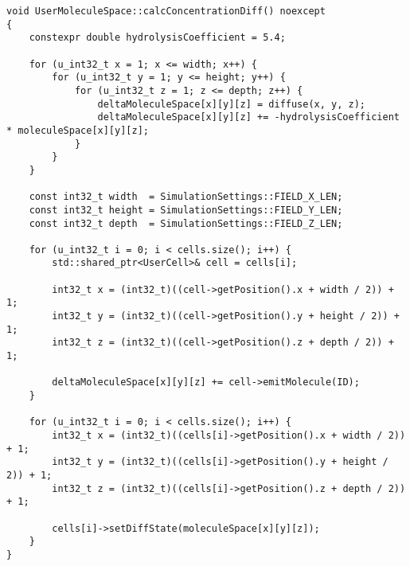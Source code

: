 \documentclass[vipdfmx,a4paper,11pt]{jsarticle}
\begin{document}
\begin{lstlisting}[caption=calcConcentrationDiff()]
void UserMoleculeSpace::calcConcentrationDiff() noexcept
{
    constexpr double hydrolysisCoefficient = 5.4;

    for (u_int32_t x = 1; x <= width; x++) {
        for (u_int32_t y = 1; y <= height; y++) {
            for (u_int32_t z = 1; z <= depth; z++) {
                deltaMoleculeSpace[x][y][z] = diffuse(x, y, z);
                deltaMoleculeSpace[x][y][z] += -hydrolysisCoefficient * moleculeSpace[x][y][z];
            }
        }
    }

    const int32_t width  = SimulationSettings::FIELD_X_LEN;
    const int32_t height = SimulationSettings::FIELD_Y_LEN;
    const int32_t depth  = SimulationSettings::FIELD_Z_LEN;
    
    for (u_int32_t i = 0; i < cells.size(); i++) {
        std::shared_ptr<UserCell>& cell = cells[i];
            
        int32_t x = (int32_t)((cell->getPosition().x + width / 2)) + 1;
        int32_t y = (int32_t)((cell->getPosition().y + height / 2)) + 1;
        int32_t z = (int32_t)((cell->getPosition().z + depth / 2)) + 1;

        deltaMoleculeSpace[x][y][z] += cell->emitMolecule(ID);
    }

    for (u_int32_t i = 0; i < cells.size(); i++) {
        int32_t x = (int32_t)((cells[i]->getPosition().x + width / 2)) + 1;
        int32_t y = (int32_t)((cells[i]->getPosition().y + height / 2)) + 1;
        int32_t z = (int32_t)((cells[i]->getPosition().z + depth / 2)) + 1;

        cells[i]->setDiffState(moleculeSpace[x][y][z]);
    }
}
\end{lstlisting}
\end{document}
